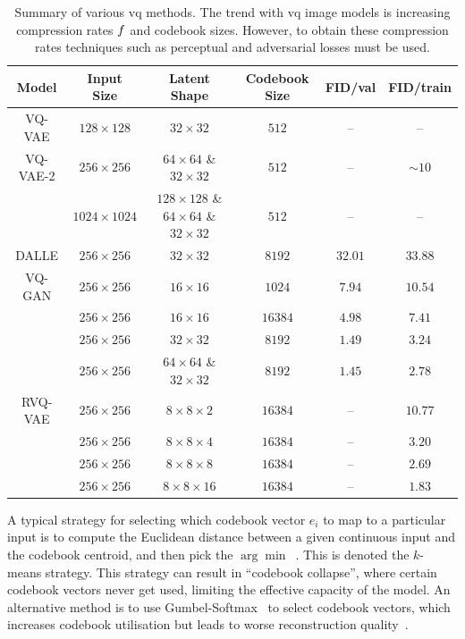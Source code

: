 \begin{table}[ht]
    \centering
    \begin{tabular}{|c|c|c|c|c|c|}
        \hline
        \textbf{Model} & \textbf{Input Size} & \textbf{Latent Shape} & \textbf{Codebook Size} & \textbf{FID/val} & \textbf{FID/train} \\
        \hline
        VQ-VAE & $128 \times 128$ & $32 \times 32$ & $512$ & -- & -- \\
        \hline
        VQ-VAE-2 & $256 \times 256$ & $64 \times 64$ \& $32 \times 32$ & $512$ & --& $\sim 10$ \\
                 & $1024 \times 1024$ & $128 \times 128$ \& $64 \times 64$ \& $32 \times 32$ & $512$ & -- & -- \\
        \hline
        DALLE & $256 \times 256$ & $32 \times 32$ & $8192$ & $32.01$ & $33.88$ \\
        \hline
        VQ-GAN & $256 \times 256$ & $16 \times 16$ & $1024$ & $7.94$ & $10.54$ \\
        & $256 \times 256$ & $16 \times 16$ & $16384$ & $4.98$ & $7.41$ \\
        & $256 \times 256$ & $32 \times 32$ & $8192$ & $1.49$ & $3.24$ \\
        & $256 \times 256$ & $64 \times 64$ \& $32 \times 32$ & $8192$ & $1.45$ & $2.78$ \\
        \hline
        RVQ-VAE & $256 \times 256$ & $8 \times 8 \times 2$ & $16384$ & -- & $10.77$ \\
        & $256 \times 256$ & $8 \times 8 \times 4$ & $16384$ & -- & $3.20$ \\
        & $256 \times 256$ & $8 \times 8 \times 8$ & $16384$ & -- & $2.69$ \\
        & $256 \times 256$ & $8 \times 8 \times 16$ & $16384$ & -- & $1.83$ \\
        \hline
    \end{tabular}
    \caption[Table]{Summary of various \acrfull{vq} methods. The trend with
    \gls{vq} image models is increasing compression rates $f$ and
    codebook sizes. However, to obtain these compression rates techniques such
    as perceptual and adversarial losses must be used.}
\end{table}

A typical strategy for selecting which codebook vector $e_i$ to map to a
particular input is to compute the Euclidean distance between a given continuous
input and the codebook centroid, and then pick the
$\arg\min$~\cite{oord2017vqvae}. This is denoted the $k$-means strategy. This
strategy can result in ``codebook collapse'', where certain codebook vectors
never get used, limiting the effective capacity of the model. An alternative
method is to use Gumbel-Softmax~\cite{jang2016gumbel} to select codebook
vectors, which increases codebook utilisation but leads to worse
reconstruction quality~\cite{bondtaylor2021unleashing}.

